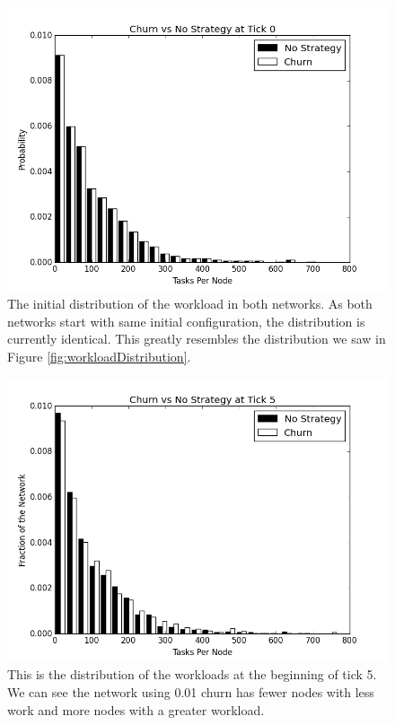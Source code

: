 \begin{figure}
\centering
\includegraphics[width=0.7\linewidth]{figs/churnStableHist0}
\caption[Workload for churn at tick 0]{The initial distribution of the workload in both networks.  As both networks start with same initial configuration, the distribution is currently identical.  This greatly resembles the distribution we saw in Figure \ref{fig:workloadDistribution}.}

\label{fig:churnStableHist0}
\end{figure}


\begin{figure}
\centering
\includegraphics[width=0.7\linewidth]{figs/churnStableHist5}
\caption[Workload for churn at tick 5]{This is the distribution of the workloads at the beginning of tick 5.  We can see the network using 0.01 churn has fewer nodes with less work and more nodes with a greater workload.}

\label{fig:churnStableHist5}
\end{figure}



